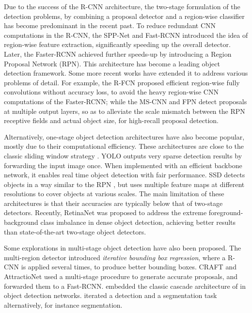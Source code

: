\documentclass[10pt,twocolumn,letterpaper]{article}
\begin{document}
Due to the success of  the R-CNN \cite{DBLP:conf/cvpr/GirshickDDM14}
architecture, the two-stage formulation of the detection problems,
by combining a proposal detector and a region-wise classifier has
become predominant in the recent past. To reduce redundant CNN
computations in the R-CNN, the SPP-Net \cite{DBLP:conf/eccv/HeZR014} and
Fast-RCNN \cite{DBLP:conf/iccv/Girshick15} introduced
the idea of region-wise feature extraction, significantly speeding up
the overall detector. Later, the Faster-RCNN \cite{DBLP:conf/nips/RenHGS15} achieved  further speeds-up by introducing a Region Proposal
Network (RPN). This architecture has become a leading object detection
framework. Some more recent works have extended it to address various
problems of detail. For example, the R-FCN \cite{DBLP:conf/nips/DaiLHS16}
proposed efficient region-wise fully convolutions without accuracy loss,
to avoid the heavy region-wise CNN computations of the Faster-RCNN;
while the MS-CNN \cite{DBLP:conf/eccv/CaiFFV16} and FPN \cite{lin2017feature}
detect proposals at multiple output layers, so as to alleviate the scale
mismatch between the RPN receptive fields and actual object size, for
high-recall proposal detection.

Alternatively, one-stage object detection architectures have also become popular, mostly due to their computational efficiency. These architectures are
close to the classic sliding window strategy \cite{DBLP:journals/ijcv/ViolaJ04,
DBLP:journals/pami/FelzenszwalbGMR10}. YOLO \cite{DBLP:conf/cvpr/RedmonDGF16}
outputs very sparse detection results by forwarding the input image once.
When implemented with an efficient backbone network, it enables real time
object detection with fair performance. SSD \cite{DBLP:conf/eccv/LiuAESRFB16}
detects objects in a way similar to the RPN \cite{DBLP:conf/nips/RenHGS15},
but uses multiple feature maps at different resolutions to cover objects at
various scales. The main limitation of these architectures is that their
accuracies are typically below that of two-stage detectors. Recently,
RetinaNet \cite{lin2017focal} was proposed to address the extreme
foreground-background class imbalance in dense object detection,
achieving better results than state-of-the-art two-stage object detectors.

Some explorations in multi-stage object detection have also been proposed.
The multi-region detector \cite{DBLP:conf/iccv/GidarisK15}
introduced \textit{iterative bounding box regression}, where a
R-CNN is applied several times, to produce better bounding boxes.
CRAFT \cite{DBLP:conf/cvpr/YangYLL16} and
AttractioNet \cite{DBLP:conf/bmvc/GidarisK16} used a multi-stage procedure
to generate accurate proposals, and forwarded them to a
Fast-RCNN. \cite{DBLP:conf/cvpr/LiLSBH15,DBLP:journals/corr/OuyangWZW17}
embedded the classic cascade architecture
of \cite{DBLP:journals/ijcv/ViolaJ04} in object detection networks.
\cite{DBLP:conf/cvpr/DaiHS16} iterated a detection and a segmentation task
alternatively, for instance segmentation.
\end{document}
